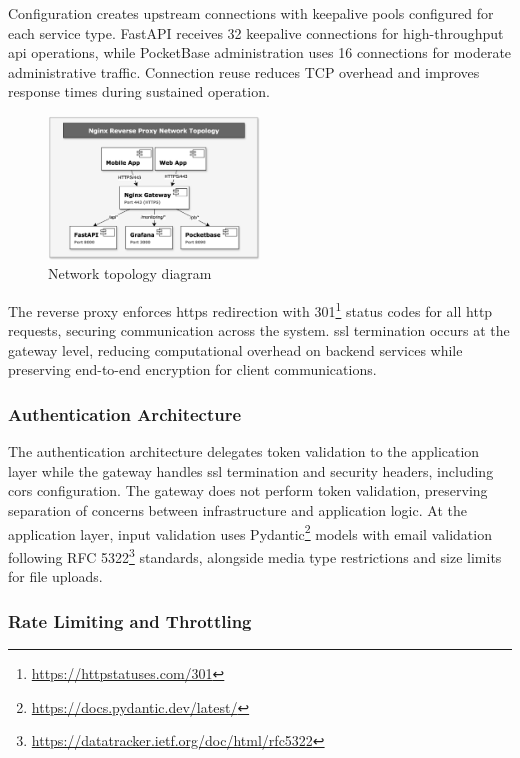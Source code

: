 Configuration creates upstream connections with keepalive pools configured for each service type. FastAPI receives 32 keepalive connections for high-throughput \ac{api} operations, while PocketBase administration uses 16 connections for moderate administrative traffic. Connection reuse reduces TCP overhead and improves response times during sustained operation.

\begin{figure}[htbp]
    \centering
    \includegraphics[width=0.5\textwidth]{figs/chapter4/network_topology.png}
    \caption[Network Topology Diagram]{Network topology diagram}
    \label{fig:network_topology}
\end{figure}

The reverse proxy enforces \ac{https} redirection with 301\footnote{\url{https://httpstatuses.com/301}} status codes for all \ac{http} requests, securing communication across the system. \ac{ssl} termination occurs at the gateway level, reducing computational overhead on backend services while preserving end-to-end encryption for client communications.

\subsubsection{Authentication Architecture} \label{subsubsection:auth_authorization}

The authentication architecture delegates token validation to the application layer while the gateway handles \ac{ssl} termination and security headers, including \ac{cors} configuration. The gateway does not perform token validation, preserving separation of concerns between infrastructure and application logic. At the application layer, input validation uses Pydantic\footnote{\url{https://docs.pydantic.dev/latest/}} models with email validation following RFC 5322\footnote{\url{https://datatracker.ietf.org/doc/html/rfc5322}} standards, alongside media type restrictions and size limits for file uploads.

\subsubsection{Rate Limiting and Throttling} \label{subsubsection:rate_limiting}

